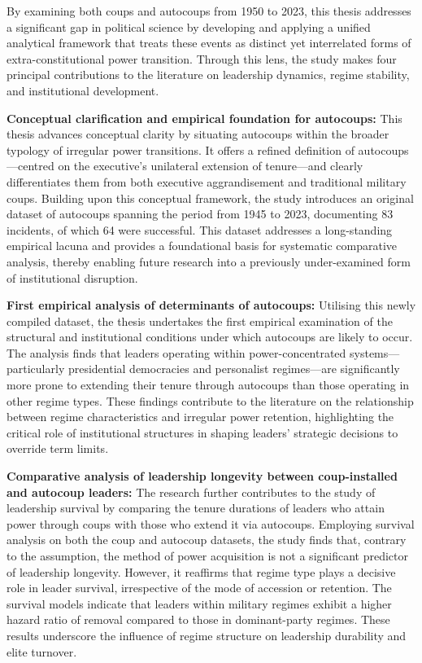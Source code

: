 \documentclass[
  12pt,
]{report}
\begin{document}
By examining both coups and autocoups from 1950 to 2023, this thesis
addresses a significant gap in political science by developing and
applying a unified analytical framework that treats these events as
distinct yet interrelated forms of extra-constitutional power
transition. Through this lens, the study makes four principal
contributions to the literature on leadership dynamics, regime
stability, and institutional development.

\textbf{Conceptual clarification and empirical foundation for
autocoups:} This thesis advances conceptual clarity by situating
autocoups within the broader typology of irregular power transitions. It
offers a refined definition of autocoups---centred on the executive's
unilateral extension of tenure---and clearly differentiates them from
both executive aggrandisement and traditional military coups. Building
upon this conceptual framework, the study introduces an original dataset
of autocoups spanning the period from 1945 to 2023, documenting 83
incidents, of which 64 were successful. This dataset addresses a
long-standing empirical lacuna and provides a foundational basis for
systematic comparative analysis, thereby enabling future research into a
previously under-examined form of institutional disruption.

\textbf{First empirical analysis of determinants of autocoups:}
Utilising this newly compiled dataset, the thesis undertakes the first
empirical examination of the structural and institutional conditions
under which autocoups are likely to occur. The analysis finds that
leaders operating within power-concentrated systems---particularly
presidential democracies and personalist regimes---are significantly
more prone to extending their tenure through autocoups than those
operating in other regime types. These findings contribute to the
literature on the relationship between regime characteristics and
irregular power retention, highlighting the critical role of
institutional structures in shaping leaders' strategic decisions to
override term limits.

\textbf{Comparative analysis of leadership longevity between
coup-installed and autocoup leaders:} The research further contributes
to the study of leadership survival by comparing the tenure durations of
leaders who attain power through coups with those who extend it via
autocoups. Employing survival analysis on both the coup and autocoup
datasets, the study finds that, contrary to the assumption, the method
of power acquisition is not a significant predictor of leadership
longevity. However, it reaffirms that regime type plays a decisive role
in leader survival, irrespective of the mode of accession or retention.
The survival models indicate that leaders within military regimes
exhibit a higher hazard ratio of removal compared to those in
dominant-party regimes. These results underscore the influence of regime
structure on leadership durability and elite turnover.
\end{document}
